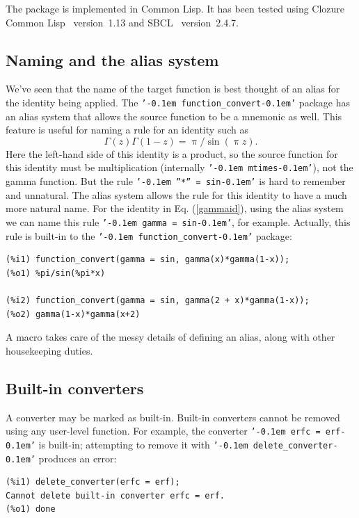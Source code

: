 \documentclass[12pt,fleqn]{extarticle}
\newcommand{\ttq}[1]{\texttt{'\kern-0.1em #1\kern-0.1em'}}
\newcommand{\funconvert}{\ttq{function\_convert}{ }}
\newenvironment{maximabox}
  {\begin{tcolorbox}[
      breakable,
      enhanced,
      colback=white,
      colframe=black!8,
      boxrule=0pt,
      borderline west={2.2pt}{0pt}{black!25},
      arc=1pt,
      left=11pt,
      right=7pt,
      top=9pt,
      bottom=9pt,
      before skip=14pt,
      after skip=14pt
    ]}
  {\end{tcolorbox}}
\begin{document}
The package is implemented in Common Lisp.  It has been tested using
Clozure Common Lisp~\cite{ccl} version~1.13 and
SBCL~\cite{sbcl} version~2.4.7.


\subsection{Naming and the alias system}
\label{sec:alias_system}
We've seen that the name of the target function is best thought of an alias for the identity being 
applied.  The \funconvert package has an alias system that allows the source function to be a
mnemonic as well.  This feature is useful for naming a rule for an identity 
such as 
\begin{equation}
\Gamma(z)\Gamma(1-z)=\uppi/\sin(\uppi z).
\label{gammaid}
\end{equation}
Here the left-hand side of this identity is a product, so the source function for this identity must be multiplication (internally \ttq{mtimes}), not the gamma function. But the rule \ttq{”*” = sin} is
hard to remember and unnatural.  The alias system allows the rule for this identity to have a much more natural name. For the identity in Eq. (\ref{gammaid}), using the alias system we can 
name this rule \ttq{gamma = sin}, for example. Actually, this rule is built-in to the \funconvert package:

\begin{maximabox}
\begin{verbatim}
(%i1) function_convert(gamma = sin, gamma(x)*gamma(1-x));
(%o1) %pi/sin(%pi*x)

(%i2) function_convert(gamma = sin, gamma(2 + x)*gamma(1-x));
(%o2) gamma(1-x)*gamma(x+2)
\end{verbatim}
\end{maximabox}

A macro takes care of the messy details of defining an alias, along with other housekeeping duties. 
 
 
 \subsection{Built-in converters}

A converter may be marked as built-in. Built-in converters cannot be removed using any user-level function. For example, the converter \ttq{erfc = erf} is built-in; attempting to remove it with \ttq{delete\_converter} produces an error:
\begin{maximabox}
\begin{verbatim}
(%i1) delete_converter(erfc = erf);
Cannot delete built-in converter erfc = erf.
(%o1) done
\end{verbatim}
\end{maximabox}
 
\end{document}
